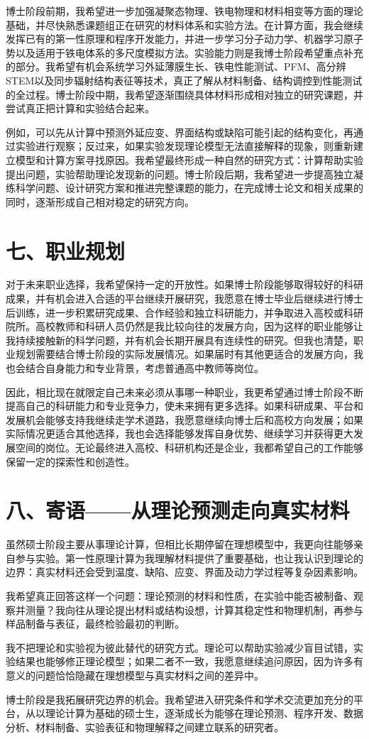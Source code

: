 博士阶段前期，我希望进一步加强凝聚态物理、铁电物理和材料相变等方面的理论基础，并尽快熟悉课题组正在研究的材料体系和实验方法。在计算方面，我会继续发挥已有的第一性原理和程序开发能力，并进一步学习分子动力学、机器学习原子势以及适用于铁电体系的多尺度模拟方法。实验能力则是我博士阶段希望重点补充的部分。我希望有机会系统学习外延薄膜生长、铁电性能测试、PFM、高分辨STEM以及同步辐射结构表征等技术，真正了解从材料制备、结构调控到性能测试的全过程。博士阶段中期，我希望逐渐围绕具体材料形成相对独立的研究课题，并尝试真正把计算和实验结合起来。

例如，可以先从计算中预测外延应变、界面结构或缺陷可能引起的结构变化，再通过实验进行观察；反过来，如果实验发现理论模型无法直接解释的现象，则重新建立模型和计算方案寻找原因。我希望最终形成一种自然的研究方式：计算帮助实验提出问题，实验帮助理论发现新的问题。博士阶段后期，我希望进一步提高独立凝练科学问题、设计研究方案和推进完整课题的能力，在完成博士论文和相关成果的同时，逐渐形成自己相对稳定的研究方向。

\section{七、职业规划}

对于未来职业选择，我希望保持一定的开放性。如果博士阶段能够取得较好的科研成果，并有机会进入合适的平台继续开展研究，我愿意在博士毕业后继续进行博士后训练，进一步积累研究成果、合作经验和独立科研能力，并争取进入高校或科研院所。高校教师和科研人员仍然是我比较向往的发展方向，因为这样的职业能够让我持续接触新的科学问题，并有机会长期开展具有连续性的研究。但我也清楚，职业规划需要结合博士阶段的实际发展情况。如果届时有其他更适合的发展方向，我也会结合自身能力和专业背景，考虑普通高中教师等岗位。

因此，相比现在就限定自己未来必须从事哪一种职业，我更希望通过博士阶段不断提高自己的科研能力和专业竞争力，使未来拥有更多选择。如果科研成果、平台和发展机会能够支持我继续走学术道路，我愿意继续向博士后和高校方向发展；如果实际情况更适合其他选择，我也会选择能够发挥自身优势、继续学习并获得更大发展空间的岗位。无论最终进入高校、科研机构还是企业，我都希望自己的工作能够保留一定的探索性和创造性。

\section{八、寄语——从理论预测走向真实材料}

虽然硕士阶段主要从事理论计算，但相比长期停留在理想模型中，我更向往能够亲自参与实验。第一性原理计算为我理解材料提供了重要基础，也让我认识到理论的边界：真实材料还会受到温度、缺陷、应变、界面及动力学过程等复杂因素影响。

我希望真正回答这样一个问题：理论预测的材料和性质，在实验中能否被制备、观察并测量？我向往从理论提出材料或结构设想，计算其稳定性和物理机制，再参与样品制备与表征，最终检验最初的判断。

我不把理论和实验视为彼此替代的研究方式。理论可以帮助实验减少盲目试错，实验结果也能够修正理论模型；如果二者不一致，我愿意继续追问原因，因为许多有意义的问题恰恰隐藏在理想模型与真实材料之间的差异中。

博士阶段是我拓展研究边界的机会。我希望进入研究条件和学术交流更加充分的平台，从以理论计算为基础的硕士生，逐渐成长为能够在理论预测、程序开发、数据分析、材料制备、实验表征和物理解释之间建立联系的研究者。
